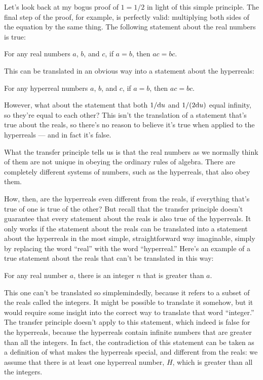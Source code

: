 Let's look back at my bogus proof of $1=1/2$ in light of this simple principle. The final step of the proof,
for example, is perfectly valid: multiplying both sides of the equation by the same thing. The following
statement about the real numbers is true:

\begin{indentedblock}
For any real numbers $a$, $b$, and $c$, if $a=b$, then $ac=bc$.
\end{indentedblock}

This can be translated in an obvious way into a statement about the hyperreals:

\begin{indentedblock}
For any hyperreal numbers $a$, $b$, and $c$, if $a=b$, then $ac=bc$.
\end{indentedblock}

However, what about the statement that both $1/\textup{d} u$ and $1/(2\textup{d} u)$ equal infinity, so they're
equal to each other? This isn't the translation of a statement that's true about the reals, so there's
no reason to believe it's true when applied to the hyperreals --- and in fact it's false.

What the transfer principle tells us is that the real numbers as we normally
think of them are not unique in obeying the ordinary rules of algebra. There are completely different
systems of numbers, such as the hyperreals, that also obey them.

How, then, are the hyperreals even
different from the reals, if everything that's true of one is true of the other? But recall that
the transfer principle doesn't guarantee that every statement about the reals is also true of the
hyperreals. It only works if the statement about the reals can be translated into a statement
about the hyperreals in the most simple, straightforward way imaginable, simply by replacing
the word ``real'' with the word ``hyperreal.'' Here's an example of a true statement about the reals that
can't be translated in this way:

\begin{indentedblock}
For any real number $a$, there is an integer $n$ that is greater than $a$.
\end{indentedblock}

This one can't be translated so simplemindedly, because it refers to a subset of the reals called
the integers. It might be possible to translate it somehow, but it would require some insight into
the correct way to translate that word ``integer.'' The transfer principle doesn't apply to this
statement, which indeed is false for the hyperreals, because the hyperreals contain infinite
numbers that are greater than all the integers. In fact, the contradiction of this statement can be
taken as a definition of what makes the hyperreals special, and different from the reals: we assume
that there is at least one hyperreal number, $H$, which is greater than all the integers.

